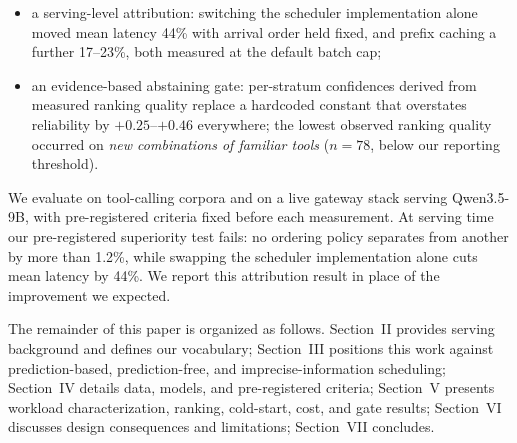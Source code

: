 \begin{itemize}
        another, and there the learned ranker beats arrival order by 4.2\%
        while ordering by prompt length runs 8.5\% slower than not reordering
        at all;
  \item a serving-level attribution: switching the scheduler implementation
        alone moved mean latency 44\% with arrival order held fixed, and
        prefix caching a further 17--23\%, both measured at the default
        batch cap;
  \item an evidence-based abstaining gate: per-stratum confidences derived
        from measured ranking quality replace a hardcoded constant that
        overstates reliability by $+0.25$--$+0.46$ everywhere; the lowest
        observed ranking quality occurred on \emph{new combinations of
        familiar tools} ($n{=}78$, below our reporting threshold).
\end{itemize}

We evaluate on tool-calling corpora and on a live gateway stack
serving Qwen3.5-9B, with pre-registered criteria fixed before each
measurement. At serving time our pre-registered superiority test fails: no ordering
policy separates from another by more than 1.2\%, while swapping the scheduler
implementation alone cuts mean latency by 44\%. We report this attribution
result in place of the improvement we expected.

The remainder of this paper is organized as follows.
Section~II provides serving background and defines our vocabulary;
Section~III positions this work against prediction-based, prediction-free,
and imprecise-information scheduling; Section~IV details data, models, and
pre-registered criteria; Section~V presents workload characterization,
ranking, cold-start, cost, and gate results; Section~VI discusses design
consequences and limitations; Section~VII concludes.

